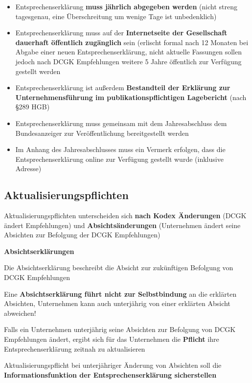 \documentclass[
]{article}
\begin{document}
\begin{itemize}
\item
  Entsprechenserklärung \textbf{muss jährlich abgegeben werden} (nicht
  streng tagesgenau, eine Überschreitung um wenige Tage ist
  unbedenklich)
\item
  Entsprechenserklärung muss auf der \textbf{Internetseite der
  Gesellschaft dauerhaft öffentlich zugänglich} sein (erlischt formal
  nach 12 Monaten bei Abgabe einer neuen Entsprechenserklärung, nicht
  aktuelle Fassungen sollen jedoch nach DCGK Empfehlungen weitere 5
  Jahre öffentlich zur Verfügung gestellt werden
\item
  Entsprechenserklärung ist außerdem \textbf{Bestandteil der Erklärung
  zur Unternehmensführung im publikationspflichtigen Lagebericht} (nach
  §289 HGB)
\item
  Entsprechenserklärung muss gemeinsam mit dem Jahresabschluss dem
  Bundesanzeiger zur Veröffentlichung bereitgestellt werden
\item
  Im Anhang des Jahresabschlusses muss ein Vermerk erfolgen, dass die
  Entsprechenserklärung online zur Verfügung gestellt wurde (inklusive
  Adresse)
\end{itemize}

\hypertarget{aktualisierungspflichten}{%
\subsection{Aktualisierungspflichten}\label{aktualisierungspflichten}}

Aktualisierungspflichten unterscheiden sich \textbf{nach Kodex
Änderungen} (DCGK ändert Empfehlungen) und \textbf{Absichtsänderungen}
(Unternehmen ändert seine Absichten zur Befolgung der DCGK Empfehlungen)

\textbf{Absichtserklärungen}

Die Absichtserklärung beschreibt die Absicht zur zukünftigen Befolgung
von DCGK Empfehlungen

Eine \textbf{Absichtserklärung führt nicht zur Selbstbindung} an die
erklärten Absichten, Unternehmen kann auch unterjährig von einer
erklärten Absicht abweichen!

Falls ein Unternehmen unterjährig seine Absichten zur Befolgung von DCGK
Empfehlungen ändert, ergibt sich für das Unternehmen die
\textbf{Pflicht} ihre Entsprechenserklärung zeitnah zu aktualisieren

Aktualisierungspflicht bei unterjähriger Änderung von Absichten soll die
\textbf{Informationsfunktion der Entsprechenserklärung sicherstellen}
\end{document}
